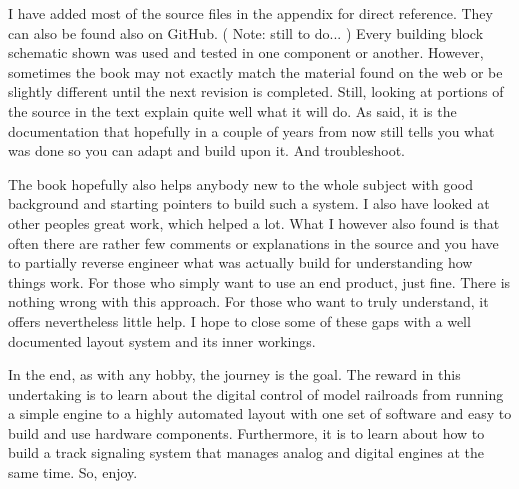 I have added most of the source files in the appendix for direct reference. They can also be found also on GitHub. ( Note: still to do... ) Every building block schematic shown was used and tested in one component or another. However, sometimes the book may not exactly match the material found on the web or be slightly different until the next revision is completed. Still, looking at portions of the source in the text explain quite well what it will do. As said, it is the documentation that hopefully in a couple of years from now still tells you what was done so you can adapt and build upon it. And troubleshoot.

The book hopefully also helps anybody new to the whole subject with good background and starting pointers to build such a system. I also have looked at other peoples great work, which helped a lot. What I however also found is that often there are rather few comments or explanations in the source and you have to partially reverse engineer what was actually build for understanding how things work. For those who simply want to use an end product, just fine. There is nothing wrong with this approach. For those who want to truly understand, it offers nevertheless little help. I hope to close some of these gaps with a well documented layout system and its inner workings.

In the end, as with any hobby, the journey is the goal. The reward in this undertaking is to learn about the digital control of model railroads from running a simple engine to a highly automated layout with one set of software and easy to build and use hardware components. Furthermore, it is to learn about how to build a track signaling system that manages analog and digital engines at the same time. So, enjoy.



